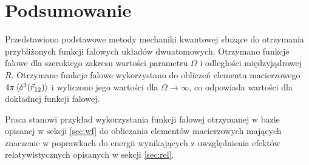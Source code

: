 \documentclass[a4paper,12pt]{article}
\numberwithin{equation}{section}
\numberwithin{table}{section}
\numberwithin{figure}{section}
\begin{document}

%
%
\newpage
\section{Podsumowanie}
Przedstawiono podstawowe metody mechaniki kwantowej służące do otrzymania przybliżonych funkcji falowych układów dwuatomowych. Otrzymano funkcje falowe dla szerokiego zakresu wartości parametru $\Omega$ i odległości międzyjądrowej $R$. Otrzymane funkcje falowe wykorzystano do obliczeń elementu macierzowego $4\pi\braket{\delta^3(\vec{r}_{12})}$ i wyliczono jego wartości dla $\Omega \rightarrow \infty$, co odpowiada wartości dla dokładnej funkcji falowej.

Praca stanowi przykład wykorzystania funkcji falowej otrzymanej w bazie opisanej w sekcji \ref{sec:wf} do obliczania elementów macierzowych mających znaczenie w poprawkach do energii wynikających z uwzględnienia efektów relatywistycznych opisanych w sekcji \ref{sec:rel}.
%
%



%
%
\end{document}
